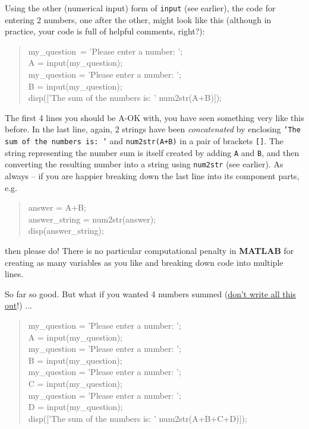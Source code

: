\documentclass{tufte-book} %
\newenvironment{docspec}{\begin{quotation}\ttfamily\parskip0pt\parindent0pt\ignorespaces}{\end{quotation}}
\begin{document}
Using the other (numerical input) form of \texttt{input} (see earlier), the code for entering 2 numbers, one after the other, might look like this (although in practice, your code is full of helpful comments, right?):
\begin{docspec}
my\_question\ = 'Please enter a number: ';
\\A = input(my\_question);
\\my\_question = 'Please enter a number: ';
\\B = input(my\_question);
\\disp(['The sum of the numbers is:  ' num2str(A+B)]);
\end{docspec}

The first 4 lines you should be A-OK with, you have seen something very like this before. In the last line, again, 2 strings have been \textit{concatenated} by enclosing \texttt{'The sum of the numbers is:  '} and \texttt{num2str(A+B)} in a pair of brackets \texttt{[]}. The string representing the number sum is itself created by adding \texttt{A} and \texttt{B}, and then converting the resulting number into a string using \texttt{num2str} (see earlier). As always -- if you are happier breaking down the last line into its component parts, e.g.
\begin{docspec}
answer = A+B;
\\answer\_string = num2str(answer);
\\disp(answer\_string);
\end{docspec}
then please do! There is no particular computational penalty in \textbf{MATLAB} for creating as many variables as you like and breaking down code into multiple lines.

So far so good. But what if you wanted 4 numbers summed (\uline{don't write all this out}!) ...
\begin{docspec}
my\_question = 'Please enter a number: ';
\\A = input(my\_question);
\\my\_question = 'Please enter a number: ';
\\B = input(my\_question);
\\my\_question = 'Please enter a number: ';
\\C = input(my\_question);
\\my\_question = 'Please enter a number: ';
\\D = input(my\_question);
\\disp(['The sum of the numbers is:  ' num2str(A+B+C+D)]);
\end{docspec}
\end{document}
